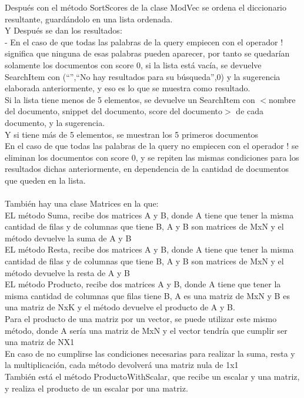 \documentclass[12pt, a4paper]{article}
\begin{document}
\begin{enumerate}
            Después con el método SortScores de la clase ModVec se ordena el diccionario
            resultante, guardándolo en una lista ordenada.\\
            Y Después se dan los resultados:\\
            - En el caso de que todas las palabras de la query empiecen con el operador !
            significa que ninguna de esas palabras pueden aparecer,
            por tanto se quedarían solamente los documentos con score 0,
            si la lista está vacía, se devuelve SearchItem con
            (“”,“No hay resultados para su búsqueda”,0) y
            la sugerencia elaborada anteriormente, y eso es lo que se muestra como resultado.\\
            Si la lista tiene menos de 5 elementos, se devuelve un SearchItem con
            $<$nombre del documento, snippet del documento, score del documento$>$
            de cada documento, y la sugerencia.\\
            Y si tiene más de 5 elementos, se muestran los 5 primeros documentos\\
            En el caso de que todas las palabras de la query no empiecen con el operador !
            se eliminan los documentos con score 0, y se repiten las mismas condiciones
            para los resultados dichas anteriormente, en dependencia de la cantidad de
            documentos que queden en la lista.\\
            \\
            También hay una clase Matrices en la que:\\

            EL método Suma, recibe dos matrices A y B, donde A tiene que tener
            la misma cantidad de filas y de columnas que tiene B, A y B son matrices de MxN
            y el método devuelve la suma de A y B\\
            EL método Resta, recibe dos matrices A y B, donde A tiene que tener la
            misma cantidad de filas y de columnas que tiene B, A y B son matrices de MxN y
            el método devuelve la resta de A y B\\
            EL método Producto, recibe dos matrices A y B, donde A tiene que tener la misma
            cantidad de columnas que filas tiene B, A es una matriz de MxN y B es una matriz
            de NxK y el método devuelve el producto de A y B.\\
            Para el producto de una matriz por un vector, se puede utilizar este mismo método,
            donde A sería una matriz de MxN y el vector tendría que cumplir ser una matriz
            de NX1\\
            En caso de no cumplirse las condiciones necesarias para realizar la suma, resta y
            la multiplicación, cada método devolverá una matriz nula de 1x1\\
            También está el método ProductoWithScalar,
            que recibe un escalar y una matriz, y realiza el producto de un escalar por una
            matriz.\\







\end{enumerate}
\end{document}
